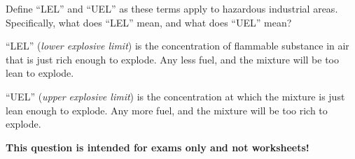 

Define ``LEL'' and ``UEL'' as these terms apply to hazardous industrial areas.  Specifically, what does ``LEL'' mean, and what does ``UEL'' mean?







``LEL'' ({\it lower explosive limit}) is the concentration of flammable substance in air that is just rich enough to explode.  Any less fuel, and the mixture will be too lean to explode.

\vskip 10pt

``UEL'' ({\it upper explosive limit}) is the concentration at which the mixture is just lean enough to explode.  Any more fuel, and the mixture will be too rich to explode.







{\bf This question is intended for exams only and not worksheets!}



